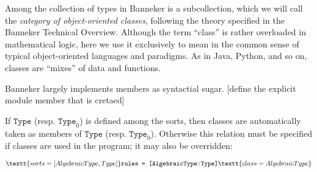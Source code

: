 \documentclass{report}
\begin{document}
Among the collection of types in Banneker is a subcollection, which we will call the \emph{category of object-oriented classes}, following the theory specified in the Banneker Technical Overview. Although the term ``class'' is rather overloaded in mathematical logic, here we use it exclusively to mean in the common sense of typical object-oriented languages and paradigms. As in Java, Python, and so on, classes are ``mixes'' of data and functions.

Banneker largely implements members as syntactial sugar. [define the explicit module member that is cretaed]

If $\texttt{Type}$ (resp. $\texttt{Type}_0$) is defined among the sorts, then classes are automatically taken as members of $\texttt{Type}$ (resp. $\texttt{Type}_0$). Otherwise this relation must be specified if classes are used in the program; it may also be overridden:

\begin{equation*}
    \textt{sorts = [AlgebraicType,Type]}
    \texttt{rules = [AlgebraicType:Type]}
    \textt{class = AlgebraicType}
\end{equation*}
\end{document}
